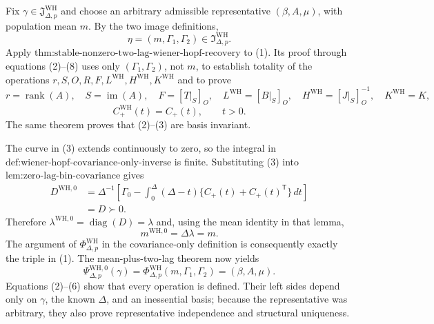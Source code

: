 Fix \(\gamma\in\mathfrak J_{\Delta,p}^{\mathrm{WH}}\) and choose an arbitrary admissible representative \((\beta,A,\mu)\), with population mean \(m\).  By the two image definitions,
\[
 \eta=(m,\Gamma_1,\Gamma_2)\in\mathfrak I_{\Delta,p}^{\mathrm{WH}}.
\tag{1}
\]
Apply \(\text{thm:stable-nonzero-two-lag-wiener-hopf-recovery}\) to (1).  Its proof through equations (2)--(8) uses only \((\Gamma_1,\Gamma_2)\), not \(m\), to establish totality of the operations
\(r,S,O,R,F,L^{\mathrm{WH}},H^{\mathrm{WH}},K^{\mathrm{WH}}\) and to prove
\[
 r=\operatorname{rank}(A),\quad S=\operatorname{im}(A),\quad
 F=[T|_S]_O,\quad L^{\mathrm{WH}}=[B|_S]_O,\quad
 H^{\mathrm{WH}}=[J|_S]_O^{-1},\quad K^{\mathrm{WH}}=K,
\tag{2}
\]
\[
 C_{+}^{\mathrm{WH}}(t)=C_{+}(t),\qquad t>0.
\tag{3}
\]
The same theorem proves that (2)--(3) are basis invariant.

The curve in (3) extends continuously to zero, so the integral in \(\text{def:wiener-hopf-covariance-only-inverse}\) is finite.  Substituting (3) into \(\text{lem:zero-lag-bin-covariance}\) gives
\[
 \begin{aligned}
 D^{\mathrm{WH},0}
 &=\Delta^{-1}\!\left[
 \Gamma_0-\int_0^\Delta(\Delta-t)
 \{C_{+}(t)+C_{+}(t)^{\mathsf T}\}\,dt\right]\\
 &=D\succ0.
 \end{aligned}
\tag{4}
\]
Therefore \(\lambda^{\mathrm{WH},0}=\operatorname{diag}(D)=\lambda\) and, using the mean identity in that lemma,
\[
 m^{\mathrm{WH},0}=\Delta\lambda=m.
\tag{5}
\]
The argument of \(\Phi_{\Delta,p}^{\mathrm{WH}}\) in the covariance-only definition is consequently exactly the triple in (1).  The mean-plus-two-lag theorem now yields
\[
 \Psi_{\Delta,p}^{\mathrm{WH},0}(\gamma)
 =\Phi_{\Delta,p}^{\mathrm{WH}}(m,\Gamma_1,\Gamma_2)
 =(\beta,A,\mu).
\tag{6}
\]
Equations (2)--(6) show that every operation is defined.  Their left sides depend only on \(\gamma\), the known \(\Delta\), and an inessential basis; because the representative was arbitrary, they also prove representative independence and structural uniqueness.

